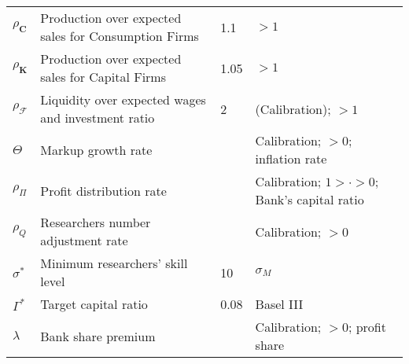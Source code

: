 \documentclass[a4paper, headings=standardclasses]{scrartcl}
\numberwithin{equation}{subsection}
\begin{document}
\begin{xltabular}{\linewidth}{lXlX}
    $\rho_\mathbf{C}$            & Production over expected sales for Consumption Firms         &  1.1     & $>1$                                                                                                                                                         \\
    $\rho_\mathbf{K}$            & Production over expected sales for Capital Firms             & 1.05      & $>1$                                                                                                                                                            \\
    $\rho_\mathcal{F}$           & Liquidity over expected wages and investment ratio           &  2     & (Calibration); $>1$                                                                                                                                                            \\
    $\Theta$                     & Markup growth rate                                           &       & Calibration; $>0$; inflation rate                                                                                                                                                            \\
    $\rho_\Pi$                      & Profit distribution rate                                     &  & Calibration; $1> \cdot >0$; Bank's capital ratio                                                                                                                                                            \\
    $\rho_Q$                     & Researchers number adjustment rate                           &       & Calibration; $>0$                                                                                                                                                            \\
    $\sigma^*$                   & Minimum researchers' skill level                             & 10  & $\sigma_M$                                                                                                                                                            \\
    $\Gamma^*$                   & Target capital ratio                                         & 0.08      & Basel III                                                                                                                                                            \\
    $\lambda$                    & Bank share premium                                           &       & Calibration; $>0$; profit share                                                                                                                                                            \\

\end{xltabular}
\end{document}
